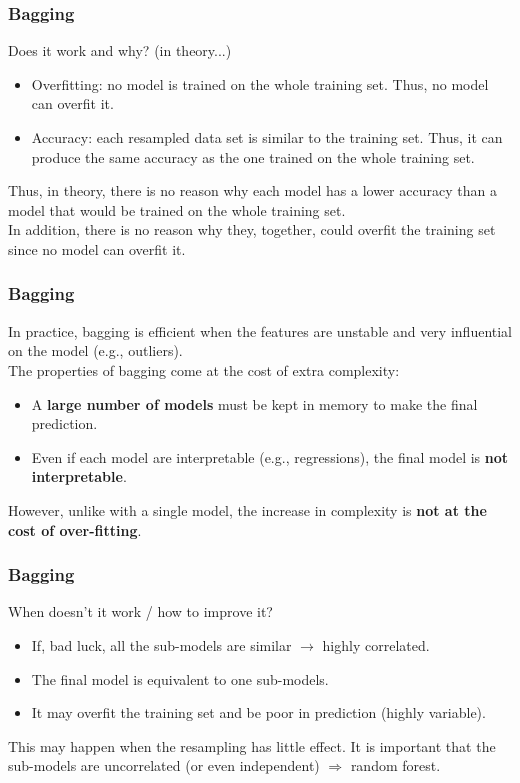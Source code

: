 \begin{frame}
\frametitle{Bagging}
Does it work and why? (in theory...)
\begin{itemize}
\item Overfitting: no model is trained on the whole training set. Thus, no model can overfit it.
\item Accuracy: each resampled data set is similar to the training set. Thus, it can produce the same accuracy as the one trained on the whole training set.
\end{itemize}
Thus, in theory, there is no reason why each model has a lower accuracy than a model that would be trained on the whole training set.\\
\vspace{0.3cm}
In addition, there is no reason why they, together, could overfit the training set since no model can overfit it.
\end{frame}
\begin{frame}
\frametitle{Bagging}
In practice, bagging is efficient when the features are unstable and very influential on the model (e.g., outliers).\\
\vspace{0.3cm}
The properties of bagging come at the cost of extra complexity: 
\begin{itemize}
\item A {\bf large number of models} must be kept in memory to make the final prediction.
\item Even if each model are interpretable (e.g., regressions), the final model is {\bf not interpretable}.
\end{itemize}
However, unlike with a single model, the increase in complexity is {\bf not at the cost of over-fitting}. 
\end{frame}
\begin{frame}
\frametitle{Bagging}
When doesn't it work / how to improve it?
\begin{itemize}
\item If, bad luck, all the sub-models are similar $\rightarrow$ highly correlated.
\item The final model is equivalent to one sub-models.
\item It may overfit the training set and be poor in prediction (highly variable).
\end{itemize}
This may happen when the resampling has little effect. It is important that the sub-models are uncorrelated (or even independent) $\Rightarrow$ random forest.
\end{frame}
